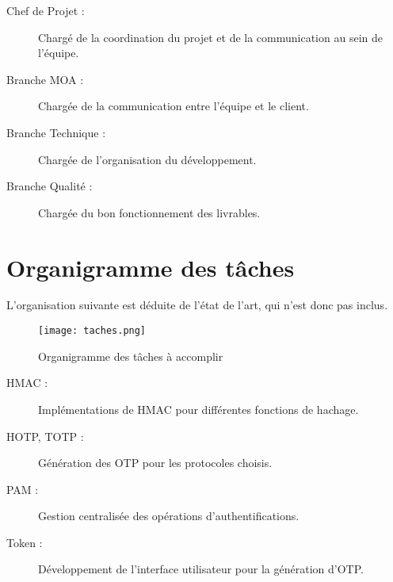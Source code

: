 \documentclass{../../res/univ-projet}
\begin{document}
	\begin{description}
		\item[Chef de Projet :] Chargé de la coordination du projet et de la communication au sein de l'équipe.
		\item[Branche MOA :] Chargée de la communication entre l'équipe et le client.
		\item[Branche Technique :] Chargée de l'organisation du développement.
		\item[Branche Qualité :] Chargée du bon fonctionnement des livrables. 
	\end{description}
	
\newpage
\section{Organigramme des tâches}
	L'organisation suivante est déduite de l'état de l'art, qui n'est donc pas inclus.
	\begin{figure}[h]
		\begin{center}
			\texttt{[image: taches.png]}
			\caption{Organigramme des tâches à accomplir}
		\end{center}
	\end{figure}
	
	\begin{description}
		\item[HMAC :] Implémentations de HMAC pour différentes fonctions de hachage.
		\item[HOTP, TOTP :] Génération des OTP pour les protocoles choisis.
		\item[PAM :] Gestion centralisée des opérations d'authentifications.
		\item[Token :] Développement de l'interface utilisateur pour la génération d'OTP.
	\end{description}
	
\newpage
\end{document}
